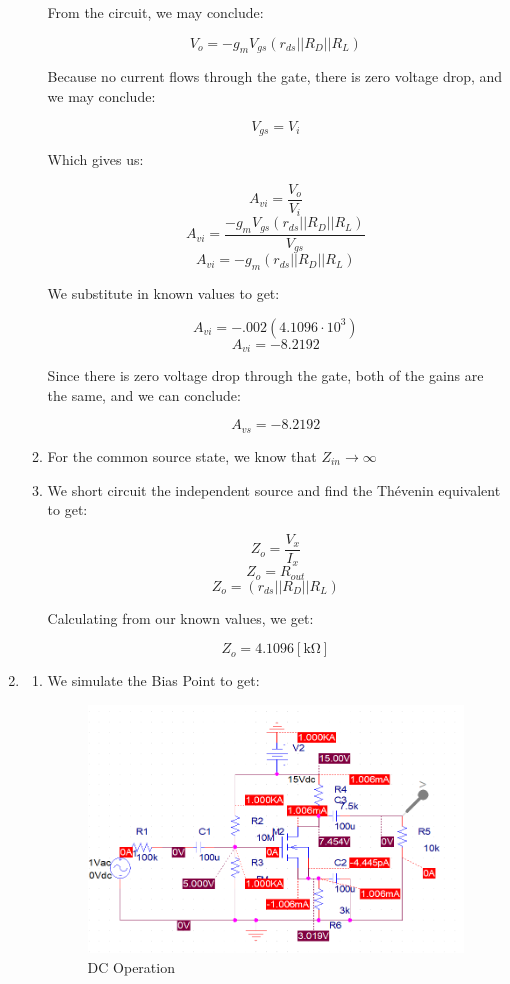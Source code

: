 \begin{enumerate}
\begin{enumerate}
        From the circuit, we may conclude:

        $$V_o=-g_mV_{gs}(r_{ds}||R_D||R_L)$$

        Because no current flows through the gate, there is zero voltage drop, and we may conclude:

        $$V_{gs}=V_i$$

        Which gives us:

        $$A_{vi}=\frac{V_o}{V_i}$$
        $$A_{vi}=\frac{-g_mV_{gs}(r_{ds}||R_D||R_L)}{V_{gs}}$$
        $$A_{vi}=-g_m(r_{ds}||R_D||R_L)$$

        We substitute in known values to get:

        $$A_{vi}=-.002(4.1096\cdot10^3)$$
        $$\boxed{A_{vi}=-8.2192}$$

        Since there is zero voltage drop through the gate, both of the gains are the same, and we can conclude:

        $$\boxed{A_{vs}=-8.2192}$$

      \item For the common source state, we know that $\boxed{Z_{in}\to\infty}$

      \item We short circuit the independent source and find the Th\'evenin equivalent to get:

        $$Z_o=\frac{V_x}{I_x}$$
        $$Z_o=R_{out}$$
        $$\boxed{Z_o=(r_{ds}||R_D||R_L)}$$

        Calculating from our known values, we get:

        $$\boxed{Z_o=4.1096[\si{\kilo\ohm}]}$$

    \end{enumerate}

  \item

    \begin{enumerate}

      \item We simulate the Bias Point to get:

        \begin{figure}[H]
          \centering
          \includegraphics[width=.8\textwidth]{Figures/HW11-4a}
          \caption{DC Operation}
          \label{fig:3}
        \end{figure}


\end{enumerate}
\end{enumerate}
